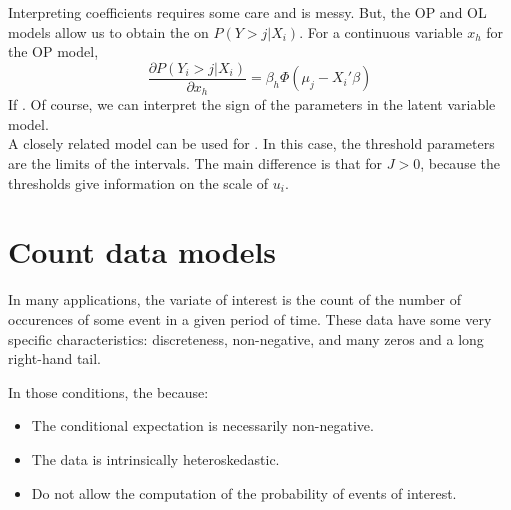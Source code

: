 Interpreting coefficients requires some care and is messy. But, the OP and OL models allow us to obtain the  on $P(Y>j|X_i)$.
For a continuous variable $x_h$ for the OP model,
\begin{equation*}
    \frac{\partial P(Y_i>j|X_i)}{\partial x_h} = \beta_h\Phi(\mu_j - X_i'\beta)
\end{equation*}
If . Of course, we can interpret the sign of the parameters in the latent variable model.
\\

A closely related model can be used for . In this case, the threshold parameters are the limits of the intervals.
The main difference is that for $J>0$,  because the thresholds give information on the scale of $u_i$.

\section{Count data models}
In many applications, the variate of interest is the count of the number of occurences of some event in a given period of time.
These data have some very specific characteristics: discreteness, non-negative, and many zeros and a long right-hand tail.

In those conditions, the  because:
\begin{itemize}
    \item The conditional expectation is necessarily non-negative. 
    \item The data is intrinsically heteroskedastic.
    \item Do not allow the computation of the probability of events of interest.
\end{itemize}

